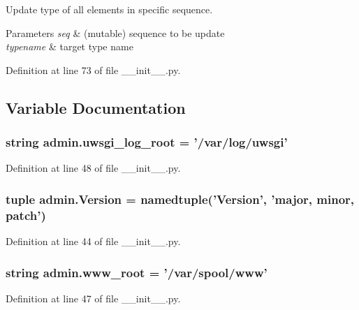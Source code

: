 Update type of all elements in specific sequence. 


\begin{DoxyParams}{Parameters}
{\em seq} & (mutable) sequence to be update \\
\hline
{\em typename} & target type name \\
\hline
\end{DoxyParams}


Definition at line 73 of file \-\_\-\-\_\-init\-\_\-\-\_\-.\-py.



\subsection{Variable Documentation}
\hypertarget{namespaceadmin_a2724e95b198b0f24232cd4c3d70e66a9}{
\subsubsection[{uwsgi\-\_\-log\-\_\-root}]{\setlength{\rightskip}{0pt plus 5cm}string admin.\-uwsgi\-\_\-log\-\_\-root = '/var/log/uwsgi'}}\label{namespaceadmin_a2724e95b198b0f24232cd4c3d70e66a9}


Definition at line 48 of file \-\_\-\-\_\-init\-\_\-\-\_\-.\-py.

\hypertarget{namespaceadmin_acbbc1dce90a9452383bd52c69b4a7489}{
\subsubsection[{Version}]{\setlength{\rightskip}{0pt plus 5cm}tuple admin.\-Version = namedtuple('Version', 'major, minor, patch')}}\label{namespaceadmin_acbbc1dce90a9452383bd52c69b4a7489}


Definition at line 44 of file \-\_\-\-\_\-init\-\_\-\-\_\-.\-py.

\hypertarget{namespaceadmin_a872d2f895c6e9da9390fc162ea3a251a}{
\subsubsection[{www\-\_\-root}]{\setlength{\rightskip}{0pt plus 5cm}string admin.\-www\-\_\-root = '/var/spool/www'}}\label{namespaceadmin_a872d2f895c6e9da9390fc162ea3a251a}


Definition at line 47 of file \-\_\-\-\_\-init\-\_\-\-\_\-.\-py.

